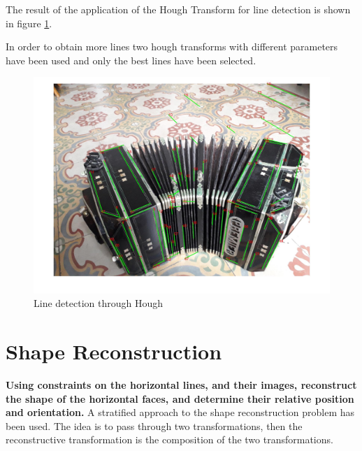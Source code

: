 \documentclass[11pt, oneside]{article}   	%
\begin{document}
The result of the application of the Hough Transform for line detection is shown in figure \ref{hough}.

In order to obtain more lines two hough transforms with different parameters have been used and only the best lines have been selected.

\begin{figure}
\includegraphics[width=0.8\linewidth]{lines.jpg}

\caption{Line detection through Hough}
\label{hough}
\end{figure}

\section{Shape Reconstruction}
\textbf{Using constraints on the horizontal lines, and their images, reconstruct the shape of the horizontal faces, and determine their relative position and orientation.} \hfill \break
A stratified approach to the shape reconstruction problem has been used. The idea is to pass through two transformations, then the reconstructive transformation is the composition of the two transformations. 

\end{document}
